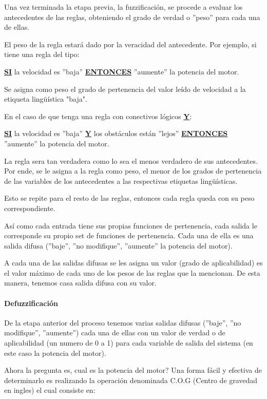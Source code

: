 Una vez terminada la etapa previa, la fuzzificación, se procede a evaluar los antecedentes de las reglas, obteniendo el grado de verdad o ''peso'' para cada una de ellas.\par

El peso de la regla estará dado por la veracidad del antecedente. Por ejemplo, si tiene una regla del tipo: \par

\begin{center}
\uline{\bfseries SI} la velocidad es ''baja'' \uline{\bfseries ENTONCES} ''aumente'' la potencia del motor.
\end{center}

Se asigna como peso el grado de pertenencia del valor leído de velocidad a la etiqueta lingüística "baja".

En el caso de que tenga una regla con conectivos lógicos \uline{\bfseries Y}:

\begin{center}
\uline{\bfseries SI} la velocidad es ''baja'' \uline{\bfseries Y} los obstáculos están ''lejos'' \uline{\bfseries ENTONCES} ''aumente'' la potencia del motor.
\end{center}

La regla sera tan verdadera como lo sea el menos verdadero de sus antecedentes. Por ende, se le asigna a la regla como peso, el menor de los grados de pertenencia de las variables de los antecedentes a las respectivas etiquetas lingüísticas.\par
Esto se repite para el resto de las reglas, entonces cada regla queda con su peso correspondiente.\par
\bigbreak
Así como cada entrada tiene sus propias funciones de pertenencia, cada salida le corresponde su propio set de funciones de pertenencia. Cada una de ella es una salida difusa (''baje'', ''no modifique'', ''aumente'' la potencia del motor).\par
\bigbreak
A cada una de las salidas difusas se les asigna un valor (grado de aplicabilidad) es el valor máximo de cada uno de los pesos de las reglas que la mencionan. De esta manera, tenemos casa salida difusa con su valor.

\paragraph{Defuzzificación}

De la etapa anterior del proceso tenemos varias salidas difusas (''baje'', ''no modifique'', ''aumente'') cada una de ellas con un valor de verdad o de aplicabilidad (un numero de 0 a 1) para cada variable de salida del sistema (en este caso la potencia del motor).\par
\bigbreak
Ahora la pregunta es, cual es la potencia del motor? Una forma fácil y efectiva de determinarlo es realizando la operación denominada C.O.G (Centro de gravedad en ingles) el cual consiste en: \par


